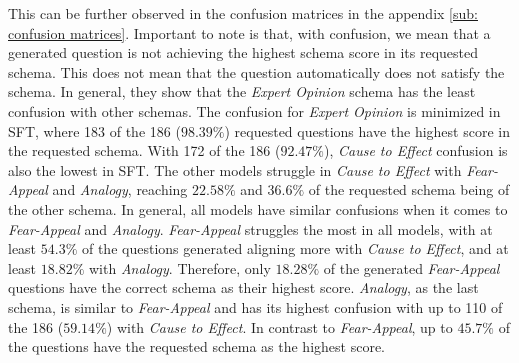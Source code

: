 \documentclass[11pt]{article}
\begin{document}
This can be further observed in the confusion matrices in the appendix \ref{sub: confusion matrices}. Important to note is that, with confusion, we mean that a generated question is not achieving the highest schema score in its requested schema. This does not mean that the question automatically does not satisfy the schema. In general, they show that the \textit{Expert Opinion} schema has the least confusion with other schemas. The confusion for \textit{Expert Opinion} is minimized in SFT, where 183 of the 186 ($98.39\%$) requested questions have the highest score in the requested schema. With 172 of the 186 ($92.47\%$), \textit{Cause to Effect} confusion is also the lowest in SFT. The other models struggle in \textit{Cause to Effect} with \textit{Fear-Appeal} and \textit{Analogy}, reaching $22.58\%$ and $36.6\%$ of the requested schema being of the other schema. In general, all models have similar confusions when it comes to \textit{Fear-Appeal} and \textit{Analogy}. \textit{Fear-Appeal} struggles the most in all models, with at least $54.3\%$ of the questions generated aligning more with \textit{Cause to Effect}, and at least $18.82\%$ with \textit{Analogy}. Therefore, only $18.28\%$ of the generated \textit{Fear-Appeal} questions have the correct schema as their highest score. \textit{Analogy}, as the last schema, is similar to \textit{Fear-Appeal} and has its highest confusion with up to 110 of the 186 ($59.14\%$) with \textit{Cause to Effect}. In contrast to \textit{Fear-Appeal}, up to $45.7\%$ of the questions have the requested schema as the highest score.
\end{document}
